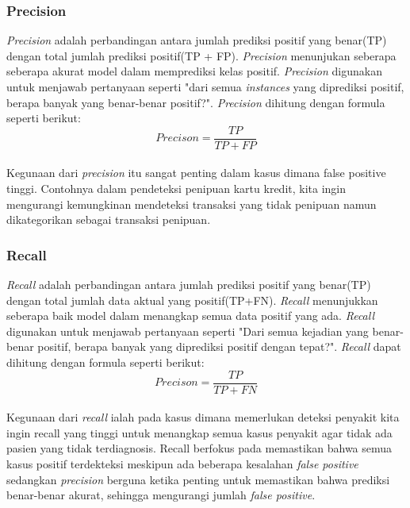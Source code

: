 \subsubsection{Precision}
\textit{Precision} adalah perbandingan antara jumlah prediksi positif yang benar(TP) dengan total jumlah prediksi positif(TP + FP). \textit{Precision} menunjukan seberapa seberapa akurat model dalam memprediksi kelas positif. \textit{Precision} digunakan untuk menjawab pertanyaan seperti "dari semua \textit{instances} yang diprediksi positif, berapa banyak yang benar-benar positif?". \textit{Precision} dihitung dengan formula seperti berikut:\\
\begin{equation}
Precison = \frac{TP}{TP + FP} 
\end{equation}
\label{eq:2.precision}
\\
Kegunaan dari \textit{precision} itu sangat penting dalam kasus dimana false positive tinggi. Contohnya dalam pendeteksi penipuan kartu kredit, kita ingin mengurangi kemungkinan mendeteksi transaksi yang tidak penipuan namun dikategorikan sebagai transaksi penipuan.
   
\subsubsection{Recall}
\textit{Recall} adalah perbandingan antara jumlah prediksi positif yang benar(TP) dengan total jumlah data aktual yang positif(TP+FN). \textit{Recall} menunjukkan seberapa baik model dalam menangkap semua data positif yang ada. \textit{Recall} digunakan untuk menjawab pertanyaan seperti "Dari semua kejadian yang benar-benar positif, berapa banyak yang diprediksi positif dengan tepat?". \textit{Recall} dapat dihitung dengan formula seperti berikut:\\
\begin{equation}
Precison = \frac{TP}{TP + FN} 
\end{equation}
\label{eq:2.recall}
\\
Kegunaan dari \textit{recall} ialah pada kasus dimana memerlukan deteksi penyakit kita ingin recall yang tinggi untuk menangkap semua kasus penyakit agar tidak ada pasien yang tidak terdiagnosis. Recall berfokus pada  memastikan bahwa semua kasus positif terdekteksi meskipun ada beberapa kesalahan \textit{false positive} sedangkan \textit{precision} berguna ketika penting untuk memastikan bahwa prediksi benar-benar akurat, sehingga mengurangi jumlah \textit{false positive}.


